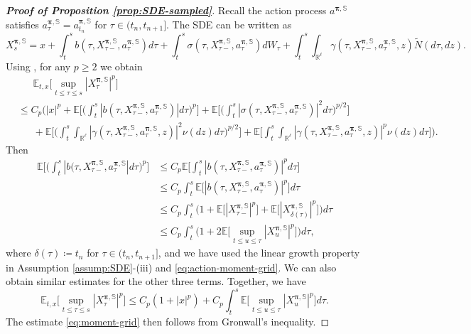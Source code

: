 \documentclass[11pt]{article}
\newcommand{\1}{\mathbbm{1}}
\newcommand{\bpi}{\boldsymbol{\pi}}
\begin{document}
\begin{proof}[\bf Proof of Proposition \ref{prop:SDE-sampled}]
	Recall the action process $a^{\bpi,\mathbb{S}}$ satisfies $a^{\bpi,\mathbb{S}}_{\tau}=a_{t_n}^{\bpi,\mathbb{S}}$ for $\tau\in (t_n,t_{n+1}]$. The SDE can be written as
	\begin{equation}
	 X^{\bpi, \mathbb{S}}_s = x + \int_t^s b(\tau, X^{\bpi, \mathbb{S}}_{\tau-}, a^{\bpi,\mathbb{S}}_{\tau}) d\tau + \int_t^s\sigma (\tau, X^{\bpi, \mathbb{S}}_{\tau-}, a^{\bpi,\mathbb{S}}_{\tau}) dW_{\tau} + \int_t^s\int_{\mathbb{R}^\ell} \gamma(\tau, X^{\bpi, \mathbb{S}}_{\tau-}, a^{\bpi,\mathbb{S}}_{\tau}, z) \widetilde N(d\tau, dz).
 	\end{equation}
	Using \cite[Theorem 2.11]{kunita2004stochastic}, for any $p\geq 2$ we obtain
	\begin{align}
		&\phantom{\leq~}\mathbb{E}_{t,x}\Big[\sup_{t\le \tau\le s}|X_{\tau}^{\bpi, \mathbb{S}}|^p\Big]\\
		&\leq C_p\Big(|x|^p + \mathbb{E}\Big[\Big(\int_t^s |b(\tau, X^{\bpi, \mathbb{S}}_{\tau-}, a^{\bpi,\mathbb{S}}_{\tau})| d\tau\Big)^p\Big] + \mathbb{E}\Big[\Big(\int_t^s |\sigma(\tau, X^{\bpi, \mathbb{S}}_{\tau-}, a^{\bpi,\mathbb{S}}_{\tau})|^2 d\tau\Big)^{p/2}\Big]\\
		&\phantom{\leq~} +  \mathbb{E}\Big[\Big(\int_t^s \int_{\mathbb{R}^\ell} |\gamma(\tau, X^{\bpi, \mathbb{S}}_{\tau-}, a^{\bpi,\mathbb{S}}_{\tau}, z)|^2 \nu(dz) d\tau\Big)^{p/2}\Big] + \mathbb{E}\Big[\int_t^s \int_{\mathbb{R}^\ell} |\gamma(\tau, X^{\bpi, \mathbb{S}}_{\tau-}, a^{\bpi,\mathbb{S}}_{\tau}, z)|^p \nu(dz) d\tau\Big]\Big).
	\end{align}
	Then
	\begin{align}
		\mathbb{E}\Big[\Big(\int_t^s |b(\tau, X^{\bpi, \mathbb{S}}_{\tau-}, a^{\bpi,\mathbb{S}}_{\tau}| d\tau\Big)^p\Big]&\leq C_p \mathbb{E}\Big[\int_t^s |b(\tau, X^{\bpi, \mathbb{S}}_{\tau-}, a^{\bpi,\mathbb{S}}_{\tau})|^p d\tau\Big]\\
		 &\leq C_p \int_t^s \mathbb{E}\Big[|b(\tau, X^{\bpi, \mathbb{S}}_{\tau-}, a^{\bpi,\mathbb{S}}_{\tau})|^p \Big]d\tau\\
		 &\leq C_p \int_t^s \big(1+ \mathbb{E}\big[|X^{\bpi, \mathbb{S}}_{\tau-}|^p\big] + \mathbb{E}\big[|X^{\bpi, \mathbb{S}}_{\delta(\tau)}|^p\big]\big) d\tau\\
		 &\leq C_p \int_t^s\Big(1+ 2\mathbb{E}\Big[\sup_{t\le u\le \tau}|X_{u}^{\bpi, \mathbb{S}}|^p\Big]\Big)d\tau,
	\end{align}
	where $\delta(\tau)\coloneqq t_n$ for $\tau\in (t_n,t_{n+1}]$, and we have used the linear growth property in Assumption \ref{assump:SDE}-(iii) and \eqref{eq:action-moment-grid}. We can also obtain similar estimates for the other three terms. Together, we have
	\begin{equation}
		\mathbb{E}_{t,x}\Big[\sup_{t\le \tau\le s}|X_{\tau}^{\bpi, \mathbb{S}}|^p\Big]\leq C_p(1+|x|^p) + C_p\int_t^s\mathbb{E}\Big[\sup_{t\le u\le \tau}|X_{u}^{\bpi, \mathbb{S}}|^p\Big]d\tau.
	\end{equation}
	The estimate \eqref{eq:moment-grid} then follows from Gronwall's inequality. \color{black}
	\end{proof}
\end{document}
